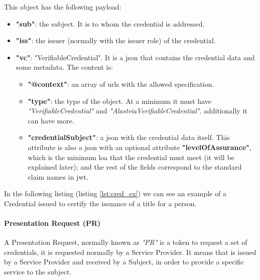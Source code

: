 This object has the following payload:
\begin{itemize}
    \item \textbf{"sub"}: the subject. It is to whom the credential is addressed.
    \item \textbf{"iss"}: the issuer (normally with the issuer role) of the credential.
    \item \textbf{"vc"}: "VerifiableCredential". It is a \acrshort{json} that contains the credential data and some metadata. The content is:
          \begin{itemize}
              \item \textbf{"@context"}: an array of \acrshort{url}s with the allowed specification.
              \item \textbf{"type"}: the type of the object. At a minimum it must have \textit{"VerifiableCredential"} and \textit{"AlastriaVerifiableCredential"}. additionally it can have more.
              \item \textbf{"credentialSubject"}: a \acrshort{json} with the credential data itself. This attribute is also a \acrshort{json} with an optional attribute \textbf{"levelOfAssurance"}, which is the minimum \acrlong{loa} that the credential must meet (it will be explained later); and the rest of the fields correspond to the standard claim names in \acrshort{jwt}.
          \end{itemize}
\end{itemize}
In the following listing (listing \ref{lst:cred_ex}) we can see an example of a Credential issued to certify the issuance of a title for a person.


\paragraph{Presentation Request (PR)}
A Presentation Request, normally known as \textit{"PR"} is a token to request a set of credentials, it is requested normally by a Service Provider. It means that is issued by a Service Provider and received by a Subject, in order to provide a specific service to the subject.

